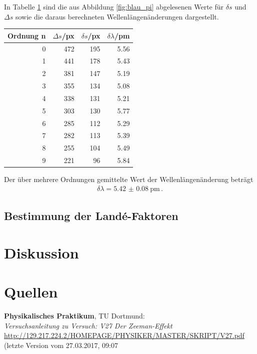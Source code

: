 \documentclass[captions=tableheading]{scrartcl}
\begin{document}
In Tabelle \ref{tab:blaupimessung} sind die aus Abbildung \ref{fig:blau_pi} abgelesenen Werte für $\delta s$ und $\Delta s$ sowie die daraus berechneten Wellenlängenänderungen dargestellt.
\begin{table}[H]
	\centering
	\label{tab:blaupimessung}
	\begin{tabular}{r r r r}
		\toprule
		Ordnung n & $\Delta s$/px & $\delta s$/px & $\delta \lambda$/pm \\
		\midrule
		0 & 472 & 195 & 5.56 \\
		1 & 441 & 178 & 5.43 \\
		2 & 381 & 147 & 5.19 \\
		3 & 355 & 134 & 5.08 \\
		4 & 338 & 131 & 5.21 \\
		5 & 303 & 130 & 5.77 \\
		6 & 285 & 112 & 5.29 \\
		7 & 282 & 113 & 5.39 \\
		8 & 255 & 104 & 5.49 \\
		9 & 221 &  96 & 5.84 \\
		\bottomrule
	\end{tabular}
\end{table}
Der über mehrere Ordnungen gemittelte Wert der Wellenlängenänderung beträgt
\begin{align}
\delta \lambda = \SI{5.42(8)}{\pico\metre}\,.
\end{align}
\subsection{Bestimmung der Landé-Faktoren}


\section{Diskussion}

\section{Quellen}
\begin{enumerate}[label={[\arabic*]}]
\item \label{q:anleitung} \textbf{Physikalisches Praktikum}, TU Dortmund: \\
\textit{Versuchsanleitung zu Versuch: V27 Der Zeeman-Effekt} \\
\url{http://129.217.224.2/HOMEPAGE/PHYSIKER/MASTER/SKRIPT/V27.pdf} (letzte Version vom 27.03.2017, 09:07
\end{enumerate}
\end{document}
